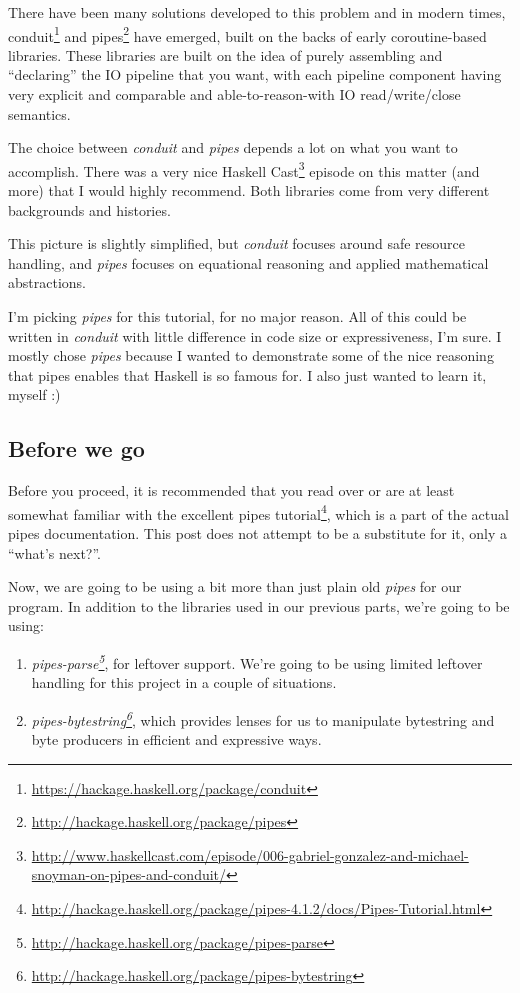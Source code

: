\documentclass[]{article}
\renewcommand{\href}[2]{#2\footnote{\url{#1}}}
\begin{document}
There have been many solutions developed to this problem and in modern times,
\href{https://hackage.haskell.org/package/conduit}{conduit} and
\href{http://hackage.haskell.org/package/pipes}{pipes} have emerged, built on
the backs of early coroutine-based libraries. These libraries are built on the
idea of purely assembling and ``declaring'' the IO pipeline that you want, with
each pipeline component having very explicit and comparable and
able-to-reason-with IO read/write/close semantics.

The choice between \emph{conduit} and \emph{pipes} depends a lot on what you
want to accomplish. There was a very nice
\href{http://www.haskellcast.com/episode/006-gabriel-gonzalez-and-michael-snoyman-on-pipes-and-conduit/}{Haskell
Cast} episode on this matter (and more) that I would highly recommend. Both
libraries come from very different backgrounds and histories.

This picture is slightly simplified, but \emph{conduit} focuses around safe
resource handling, and \emph{pipes} focuses on equational reasoning and applied
mathematical abstractions.

I'm picking \emph{pipes} for this tutorial, for no major reason. All of this
could be written in \emph{conduit} with little difference in code size or
expressiveness, I'm sure. I mostly chose \emph{pipes} because I wanted to
demonstrate some of the nice reasoning that pipes enables that Haskell is so
famous for. I also just wanted to learn it, myself :)

\subsection{Before we go}\label{before-we-go}

Before you proceed, it is recommended that you read over or are at least
somewhat familiar with the excellent
\href{http://hackage.haskell.org/package/pipes-4.1.2/docs/Pipes-Tutorial.html}{pipes
tutorial}, which is a part of the actual pipes documentation. This post does not
attempt to be a substitute for it, only a ``what's next?''.

Now, we are going to be using a bit more than just plain old \emph{pipes} for
our program. In addition to the libraries used in our previous parts, we're
going to be using:

\begin{enumerate}
\def\labelenumi{\arabic{enumi}.}
\tightlist
\item
  \emph{\href{http://hackage.haskell.org/package/pipes-parse}{pipes-parse}}, for
  leftover support. We're going to be using limited leftover handling for this
  project in a couple of situations.
\item
  \emph{\href{http://hackage.haskell.org/package/pipes-bytestring}{pipes-bytestring}},
  which provides lenses for us to manipulate bytestring and byte producers in
  efficient and expressive ways.
\end{enumerate}
\end{document}
